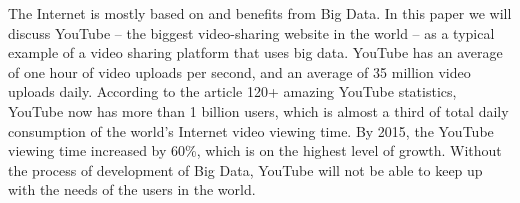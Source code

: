 The Internet is mostly based on and benefits from Big Data. In this paper we will discuss YouTube -- the biggest video-sharing website in the world -- as a typical example of a video sharing platform that uses big data. YouTube has an average of one hour of video uploads per second, and an average of 35 million video uploads daily. According to the article 120+ amazing YouTube statistics, YouTube now has more than 1 billion users, which is almost a third of total daily consumption of the world's Internet video viewing time. By 2015, the YouTube viewing time increased by 60\%, which is on the highest level of growth. Without the process of development of Big Data, YouTube will not be able to keep up with the needs of the users in the world.

